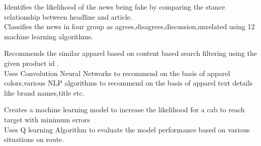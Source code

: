 \documentclass[]{deedy-resume-openfont}
\begin{document}
\begin{minipage}[t]{0.66\textwidth}
\textbullet{}Identifies the likelihood of the news being fake by comparing the stance relationship between headline and article.\\
\textbullet{}Classifies the news in four group as agrees,disagrees,discussion,unrelated using 12 machine learning algorithms.
\sectionsep


\textbullet{}Recommends the similar apparel based on content based search filtering using the given product id .\\
\textbullet{}Uses Convolution Neural Networks to recommend on the basis of apparel colors,various NLP algorithms to recommend on the basis of apparel text details like brand names,title etc.
\sectionsep

\textbullet{}Creates a machine learning model to increase the likelihood for a cab to reach target with minimum errors\\
\textbullet{}Uses Q learning Algorithm to evaluate the model performance based on various situations on route.
\sectionsep


\end{minipage}
\end{document}
